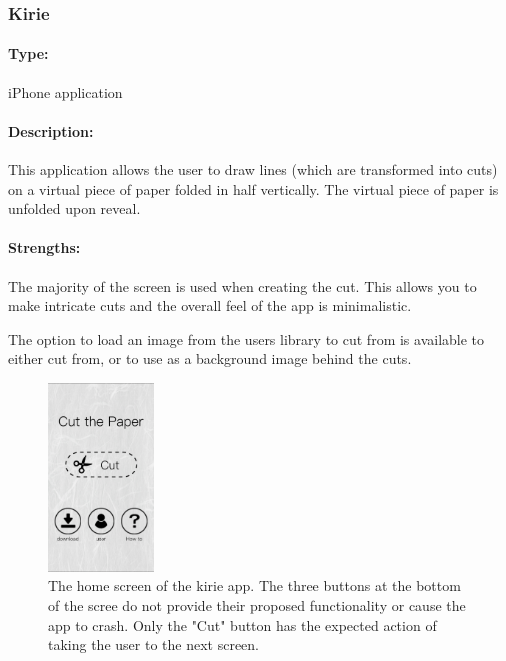\documentclass[11pt]{article}
\begin{document}
            
            \subsubsection{Kirie}
            
                \paragraph{Type:} iPhone application %

                \paragraph{Description:}
                This application allows the user to draw lines (which are transformed into cuts) on a virtual piece of paper folded in half vertically. The virtual piece of paper is unfolded upon reveal. 

                \paragraph{Strengths:}
                The majority of the screen is used when creating the cut. This allows you to make intricate cuts and the overall feel of the app is minimalistic. 
                
                The option to load an image from the users library to cut from is available to either cut from, or to use as a background image behind the cuts.
                
                 \begin{figure}
                    \centering
                    \includegraphics[width=0.25\textwidth]{Images/kirieMain.PNG}
                    \caption{The home screen of the kirie app. The three buttons at the bottom of the scree do not provide their proposed functionality or cause the app to crash. Only the "Cut" button has the expected action of taking the user to the next screen.}
                    \label{fig:kirieMain}
                \end{figure}
                
\end{document}
